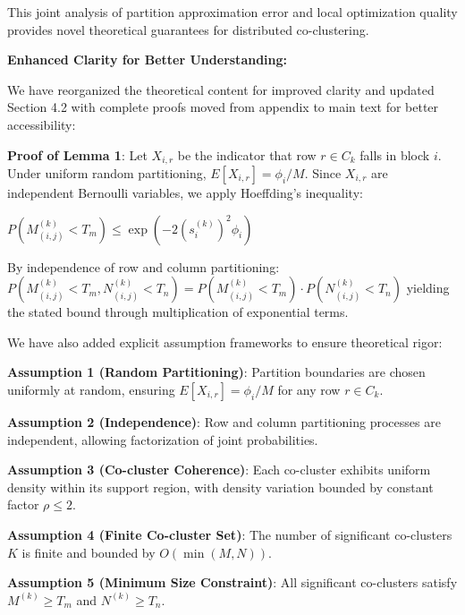 \documentclass{ar2rc}
\begin{document}
This joint analysis of partition approximation error and local optimization quality provides novel theoretical guarantees for distributed co-clustering.



\textbf{Enhanced Clarity for Better Understanding:}

We have reorganized the theoretical content for improved clarity and updated Section 4.2 with complete proofs moved from appendix to main text for better accessibility:

\textbf{Proof of Lemma 1}: Let $X_{i,r}$ be the indicator that row $r \in C_k$ falls in block $i$. Under uniform random partitioning, $E[X_{i,r}] = \phi_i/M$. Since $X_{i,r}$ are independent Bernoulli variables, we apply Hoeffding's inequality:

$P(M_{(i,j)}^{(k)} < T_m) \leq \exp\left(-2(s_i^{(k)})^2 \phi_i\right)$

By independence of row and column partitioning:
$P(M_{(i,j)}^{(k)} < T_m, N_{(i,j)}^{(k)} < T_n) = P(M_{(i,j)}^{(k)} < T_m) \cdot P(N_{(i,j)}^{(k)} < T_n)$
yielding the stated bound through multiplication of exponential terms.

We have also added explicit assumption frameworks to ensure theoretical rigor:

\textbf{Assumption 1 (Random Partitioning)}: Partition boundaries are chosen uniformly at random, ensuring $E[X_{i,r}] = \phi_i/M$ for any row $r \in C_k$.

\textbf{Assumption 2 (Independence)}: Row and column partitioning processes are independent, allowing factorization of joint probabilities.

\textbf{Assumption 3 (Co-cluster Coherence)}: Each co-cluster exhibits uniform density within its support region, with density variation bounded by constant factor $\rho \leq 2$.

\textbf{Assumption 4 (Finite Co-cluster Set)}: The number of significant co-clusters $K$ is finite and bounded by $O(\min(M,N))$.

\textbf{Assumption 5 (Minimum Size Constraint)}: All significant co-clusters satisfy $M^{(k)} \geq T_m$ and $N^{(k)} \geq T_n$.
\end{document}
